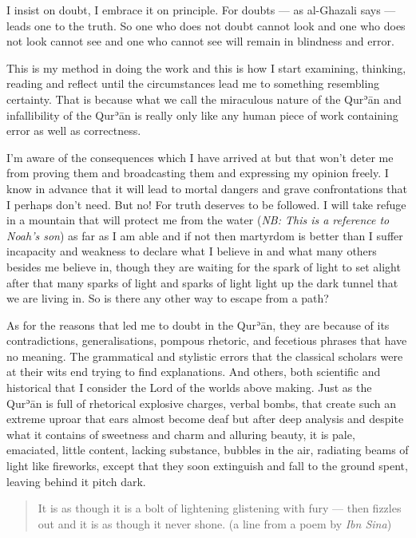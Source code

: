 \documentclass[12pt]{book}
\def \Quran{Qurʾān} %
\def \Qrn{\Quran}   %
\newcommand{\NB}[1]{\emph{NB: #1}}
\begin{document}
I insist on doubt, I embrace it on principle. For doubts — as al-Ghazali says —
leads one to the truth. So one who does not doubt cannot look and one who does
not look cannot see and one who cannot see will remain in blindness and error.

This is my method in doing the work and this is how I start examining,
thinking, reading and reflect until the circumstances lead me to something
resembling certainty. That is because what we call the miraculous nature of the
\Qrn{} and infallibility of the \Qrn{} is really only like any human piece of
work containing error as well as correctness.

I’m aware of the consequences which I have arrived at but that won’t deter me
from proving them and broadcasting them and expressing my opinion freely. I
know in advance that it will lead to mortal dangers and grave confrontations
that I perhaps don’t need. But no! For truth deserves to be followed. I will
take refuge in a mountain that will protect me from the water
(\NB{This is a reference to Noah’s son})
as far as I am able and if not then martyrdom is better than I suffer
incapacity and weakness to declare what I believe in and what many others
besides me believe in, though they are waiting for the spark of light to set
alight after that many sparks of light and sparks of light light up the dark
tunnel that we are living in. So is there any other way to escape from a path?

As for the reasons that led me to doubt in the \Quran, they are because of its
contradictions, generalisations, pompous rhetoric, and fecetious phrases that
have no meaning. The grammatical and stylistic errors that the classical
scholars were at their wits end trying to find explanations. And others, both
scientific and historical that I consider the Lord of the worlds above making.
Just as the \Qrn{} is full of rhetorical explosive charges, verbal bombs, that
create such an extreme uproar that ears almost become deaf but after deep
analysis and despite what it contains of sweetness and charm and alluring
beauty, it is pale, emaciated, little content, lacking substance, bubbles in
the air, radiating beams of light like fireworks, except that they soon
extinguish and fall to the ground spent, leaving behind it pitch dark.

\begin{quote}
It is as though it is a bolt of lightening glistening with fury — then fizzles
out and it is as though it never shone.
(a line from a poem by \emph{Ibn Sina})
\end{quote}
\end{document}

